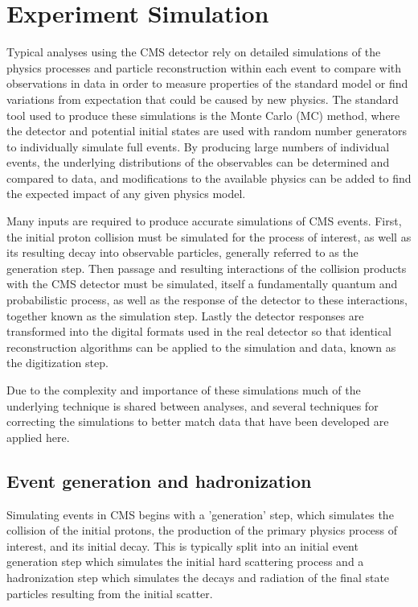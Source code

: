 \chapter{Experiment Simulation}
\label{simulation_chapter}
Typical analyses using the CMS detector rely on detailed simulations of the physics processes and particle reconstruction within each event to compare with observations in data in order to measure properties of the standard model or find variations from expectation that could be caused by new physics.
The standard tool used to produce these simulations is the Monte Carlo (MC) method, where the detector and potential initial states are used with random number generators to individually simulate full events.
By producing large numbers of individual events, the underlying distributions of the observables can be determined and compared to data, and modifications to the available physics can be added to find the expected impact of any given physics model.

Many inputs are required to produce accurate simulations of CMS events.
First, the initial proton collision must be simulated for the process of interest, as well as its resulting decay into observable particles, generally referred to as the generation step.
Then passage and resulting interactions of the collision products with the CMS detector must be simulated, itself a fundamentally quantum and probabilistic process, as well as the response of the detector to these interactions, together known as the simulation step.
Lastly the detector responses are transformed into the digital formats used in the real detector so that identical reconstruction algorithms can be applied to the simulation and data, known as the digitization step.

Due to the complexity and importance of these simulations much of the underlying technique is shared between analyses, and several techniques for correcting the simulations to better match data that have been developed are applied here. 


\section{Event generation and hadronization}
Simulating events in CMS begins with a 'generation' step, which simulates the collision of the initial protons, the production of the primary physics process of interest, and its initial decay. 
This is typically split into an initial event generation step which simulates the initial hard scattering process and a hadronization step which simulates the decays and radiation of the final state particles resulting from the initial scatter.

